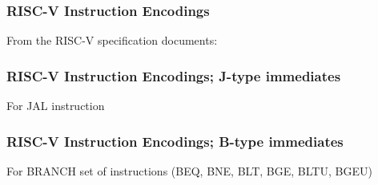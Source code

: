 \begin{frame}
\frametitle{RISC-V Instruction Encodings}

From the RISC-V specification documents:

\begin{center}
\end{center}

\end{frame}


\begin{frame}
\frametitle{RISC-V Instruction Encodings; J-type immediates}

\begin{center}
\end{center}

\vfill

For JAL instruction

\end{frame}


\begin{frame}
\frametitle{RISC-V Instruction Encodings; B-type immediates}

For BRANCH set of instructions (BEQ, BNE, BLT, BGE, BLTU, BGEU)

\vspace{1ex}

\begin{center}
\end{center}

\end{frame}

